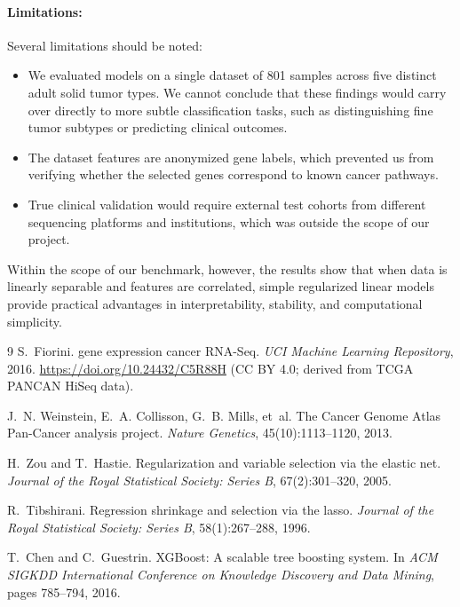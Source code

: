 \documentclass[11pt,a4paper]{article}
\begin{document}
\paragraph{Limitations:}
Several limitations should be noted:
\begin{itemize}
    \item We evaluated models on a single dataset of 801 samples across five distinct adult solid tumor types. We cannot conclude that these findings would carry over directly to more subtle classification tasks, such as distinguishing fine tumor subtypes or predicting clinical outcomes.
    \item The dataset features are anonymized gene labels, which prevented us from verifying whether the selected genes correspond to known cancer pathways.
    \item True clinical validation would require external test cohorts from different sequencing platforms and institutions, which was outside the scope of our project.
\end{itemize}
Within the scope of our benchmark, however, the results show that when data is linearly separable and features are correlated, simple regularized linear models provide practical advantages in interpretability, stability, and computational simplicity.

\begin{thebibliography}{9}
S.~Fiorini.
\newblock gene expression cancer RNA-Seq.
\newblock \emph{UCI Machine Learning Repository}, 2016. \url{https://doi.org/10.24432/C5R88H} (CC BY 4.0; derived from TCGA PANCAN HiSeq data).

J.~N. Weinstein, E.~A. Collisson, G.~B. Mills, et~al.
\newblock The Cancer Genome Atlas Pan-Cancer analysis project.
\newblock \emph{Nature Genetics}, 45(10):1113--1120, 2013.

H.~Zou and T.~Hastie.
\newblock Regularization and variable selection via the elastic net.
\newblock \emph{Journal of the Royal Statistical Society: Series B}, 67(2):301--320, 2005.

R.~Tibshirani.
\newblock Regression shrinkage and selection via the lasso.
\newblock \emph{Journal of the Royal Statistical Society: Series B}, 58(1):267--288, 1996.

T.~Chen and C.~Guestrin.
\newblock XGBoost: A scalable tree boosting system.
\newblock In \emph{ACM SIGKDD International Conference on Knowledge Discovery and Data Mining}, pages 785--794, 2016.
\end{thebibliography}
\end{document}
